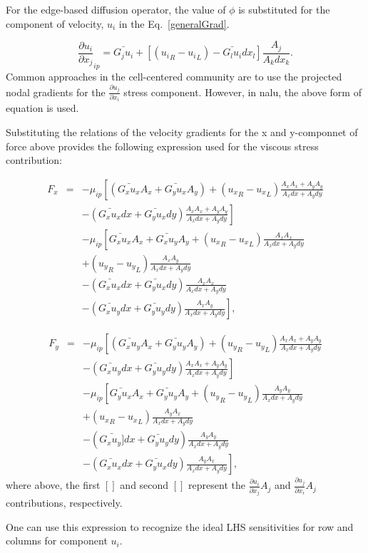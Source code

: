 For the edge-based diffusion operator, the value of
$\phi$ is substituted for the component of velocity,
$u_i$ in the Eq.~\ref{generalGrad}.

\begin{equation}
  \frac{\partial u_i}{\partial x_j}_{ip} = \bar{G_j u_i} + \left[ \left({u_i}_R - {u_i}_L \right) 
- \bar{G_l u_i}dx_l \right] \frac{A_j}{A_k dx_k}.
\end{equation}
\label{vectorGrad}
Common approaches in the cell-centered community are to use the projected nodal gradients
for the $ \frac{\partial u_j}{\partial x_i}$ stress component. However, in nalu, the above
form of equation is used.

Substituting the relations of the velocity gradients for the x and y-componnet of force above provides the
following expression used for the viscous stress contribution:

\begin{eqnarray}
  F_x &=& - \mu_{ip} \left[ \left(\bar{G_x u_x}A_x + \bar{G_y u_x}A_y \right)
    + \left( {u_x}_R -  {u_x}_L \right) \frac{A_x A_x + A_y A_y}{A_x dx + A_y dy} \right. \nonumber \\ &&
  - \left. \left( \bar{G_x u_x}dx + \bar{G_y u_x}dy \right) \frac{A_x A_x + A_y A_y} {A_x dx + A_y dy} \right] \nonumber  \\ &&
  - \mu_{ip} \left[ \bar{G_x u_x}A_x + \bar{G_x u_y}A_y + \left({u_x}_R - {u_x}_L\right) \frac{A_x A_x} {A_x dx + A_y dy} \right. \nonumber \\&&
    + \left. \left({u_y}_R - {u_y}_L\right) \frac{A_x A_y} {A_x dx + A_y dy} \right. \nonumber \\ &&
    - \left. \left( \bar{G_x u_x}dx +  \bar{G_y u_x}dy \right) \frac{A_x A_x} {A_x dx + A_y dy} \right. \nonumber \\ &&
    - \left. \left( \bar{G_x u_y}dx +  \bar{G_y u_y}dy \right) \frac{A_x A_y} {A_x dx + A_y dy} \right],
\end{eqnarray}

\begin{eqnarray}
  F_y &=& - \mu_{ip} \left[ \left(\bar{G_x u_y}A_x + \bar{G_y u_y}A_y \right)
    + \left( {u_y}_R -  {u_y}_L \right) \frac{A_x A_x + A_y A_y}{A_x dx + A_y dy} \right. \nonumber \\ &&
  - \left. \left( \bar{G_x u_y}dx + \bar{G_y u_y}dy \right) \frac{A_x A_x + A_y A_y} {A_x dx + A_y dy} \right] \nonumber \\ &&
  - \mu_{ip} \left[ \bar{G_y u_x}A_x + \bar{G_y u_y}A_y + \left({u_y}_R - {u_y}_L\right) \frac{A_y A_y} {A_x dx + A_y dy} \right. \nonumber \\&&
    + \left. \left({u_x}_R - {u_x}_L\right) \frac{A_y A_x} {A_x dx + A_y dy} \right. \nonumber \\ &&
    - \left. \left( \bar{G_x u_y]}dx +  \bar{G_y u_y}dy \right) \frac{A_y A_y} {A_x dx + A_y dy} \right. \nonumber \\ &&
    - \left. \left( \bar{G_x u_x}dx +  \bar{G_y u_x}dy \right) \frac{A_y A_x} {A_x dx + A_y dy} \right],
\end{eqnarray}
where above, the first $[]$ and second $[]$ represent the $\frac{\partial u_i}{\partial x_j}A_j$ and  
$\frac{\partial u_j}{\partial x_i}A_j$ contributions, respectively.

One can use this expression to recognize the ideal LHS sensitivities for row and columns for 
component $u_i$. 

